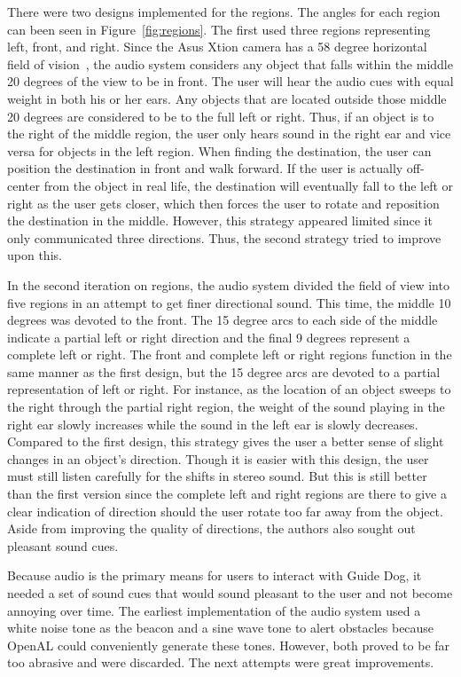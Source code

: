 There were two designs implemented for the regions. The angles for each region 
can been seen in Figure~\ref{fig:regions}. The first used three regions 
representing left, front, and right. Since the Asus Xtion camera has a 58 degree 
horizontal field of vision~\cite{xtion-website}, the audio system considers any 
object that falls within the middle 20 degrees of the view to be in front. The 
user will hear the audio cues with equal weight in both his or her ears. Any 
objects that are located outside those middle 20 degrees are considered to be to 
the full left or right. Thus, if an object is to the right of the middle region, 
the user only hears sound in the right ear and vice versa for objects in the 
left region. When finding the destination, the user can position the destination 
in front and walk forward. If the user is actually off-center from the object in 
real life, the destination will eventually fall to the left or right as the user
gets closer, which then forces the user to rotate and reposition the destination
in the middle. However, this strategy appeared limited since it only
communicated three directions. Thus, the second strategy tried to improve upon
this.

In the second iteration on regions, the audio system divided the field of view
into five regions in an attempt to get finer directional sound. This time, the
middle 10 degrees was devoted to the front. The 15 degree arcs to each side of
the middle indicate a partial left or right direction and the final 9 degrees
represent a complete left or right. The front and complete left or right regions 
function in the same manner as the first design, but the 15 degree arcs are 
devoted to a partial representation of left or right. For instance, as the
location of an object sweeps to the right through the partial right region, the 
weight of the sound playing in the right ear slowly increases while the sound in
the left ear is slowly decreases. Compared to the first design, this strategy
gives the user a better sense of slight changes in an object's direction. Though
it is easier with this design, the user must still listen carefully for the
shifts in stereo sound. But this is still better than the first version since the
complete left and right regions are there to give a clear indication of direction
should the user rotate too far away from the object. Aside from improving the
quality of directions, the authors also sought out pleasant sound cues.

Because audio is the primary means for users to interact with Guide Dog, it
needed a set of sound cues that would sound pleasant to the user and not become
annoying over time. The earliest implementation of the audio system used a
white noise tone as the beacon and a sine wave tone to alert obstacles because
OpenAL could conveniently generate these tones. However, both proved to be far
too abrasive and were discarded. The next attempts were great improvements.

